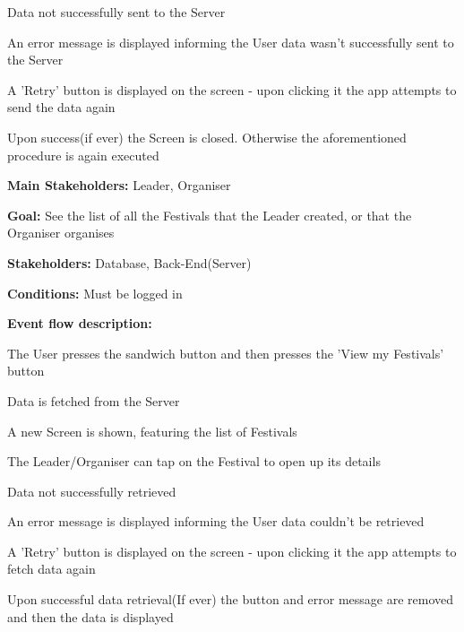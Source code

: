 \begin{packed_item}
\begin{packed_item}
						\item[5.a] Data not successfully sent to the Server
						\item[] \begin{packed_enum}
							\item An error message is displayed informing the User data wasn't successfully sent to the Server
							\item A 'Retry' button is displayed on the screen - upon clicking it the app attempts to send the data again
							\item Upon success(if ever) the Screen is closed. Otherwise the aforementioned procedure is again executed
						\end{packed_enum}
					\end{packed_item}
				\end{packed_item}	
			
				\noindent {}
				\begin{packed_item}
					\item \textbf{Main Stakeholders:} Leader, Organiser
					\item \textbf{Goal:} See the list of all the Festivals that the Leader created, or that the Organiser organises
					\item \textbf{Stakeholders: } Database, Back-End(Server)
					\item \textbf{Conditions: } Must be logged in
					\item \textbf{Event flow description: }
					\begin{packed_enum}
						\item The User presses the sandwich button and then presses the 'View my Festivals' button
						\item Data is fetched from the Server
						\item A new Screen is shown, featuring the list of Festivals
						\item The Leader/Organiser can tap on the Festival to open up its details
					\end{packed_enum}
				
					\begin{packed_item}
						\item[1.a, 4.a] Data not successfully retrieved
						\item[] \begin{packed_enum}
							\item An error message is displayed informing the User data couldn't be retrieved
							\item A 'Retry' button is displayed on the screen - upon clicking it the app attempts to fetch data again
							\item Upon successful data retrieval(If ever) the button and error message are removed and then the data is displayed
						\end{packed_enum}	
					\end{packed_item}
				\end{packed_item}
			
